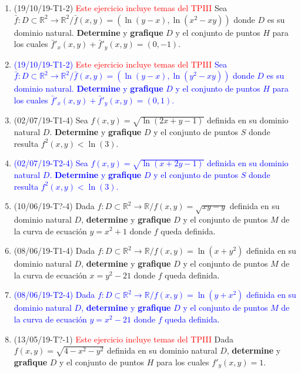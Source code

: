 \documentclass[12pt,a4paper]{article}
\newcommand{\red}[1]{\textcolor{red}{#1}}
\newcommand{\blue}[1]{\textcolor{blue}{#1}}
\newcommand{\R}{\mathbb{R}}
\begin{document}
\begin{enumerate}
	\item (19/10/19-T1-2) \red{Este ejercicio incluye temas del TPIII} Sea $\bar{f}: D\subset \R^2\rightarrow\R^2 / \bar{f}(x, y) = (\ln{(y-x)}, \ln(x^2-xy))$ donde $D$ es su dominio natural. \textbf{Determine} y \textbf{grafique} $D$ y el conjunto de puntos $H$ para los cuales $\bar{f}'_x(x,y)+\bar{f}'_y(x,y)=(0,-1)$. \label{ej:parciales8}
	
	\item \blue{(19/10/19-T1-2) \red{Este ejercicio incluye temas del TPIII} Sea $\bar{f}: D\subset \R^2\rightarrow\R^2 / \bar{f}(x, y) = (\ln{(y-x)}, \ln(y^2-xy))$ donde $D$ es su dominio natural. \textbf{Determine} y \textbf{grafique} $D$ y el conjunto de puntos $H$ para los cuales $\bar{f}'_x(x,y)+\bar{f}'_y(x,y)=(0,1)$.} \label{ej:parciales9}
	
	\item (02/07/19-T1-4) Sea $f(x, y)=\sqrt{\ln{(2x+y-1)}}$ definida en su dominio natural $D$. \textbf{Determine} y \textbf{grafique} $D$ y el conjunto de puntos $S$ donde resulta $f^2(x,y)<\ln(3)$.
	
	\item \blue{(02/07/19-T2-4) Sea $f(x, y)=\sqrt{\ln{(x+2y-1)}}$ definida en su dominio natural $D$. \textbf{Determine} y \textbf{grafique} $D$ y el conjunto de puntos $S$ donde resulta $f^2(x,y)<\ln(3)$.}
	
	\item (10/06/19-T?-4) Dada $f:D\subset\R^2\rightarrow\R / f(x, y)=\sqrt{xy-y}$ definida en su dominio natural $D$, \textbf{determine} y \textbf{grafique} $D$ y el conjunto de puntos $M$ de la curva de ecuación $y=x^2+1$ donde $f$ queda definida.
	
	\item (08/06/19-T1-4) Dada $f:D\subset\R^2\rightarrow\R / f(x, y)=\ln{(x+y^2)}$ definida en su dominio natural $D$, \textbf{determine} y \textbf{grafique} $D$ y el conjunto de puntos $M$ de la curva de ecuación $x=y^2-21$ donde $f$ queda definida.
	
	\item \blue{(08/06/19-T2-4) Dada $f:D\subset\R^2\rightarrow\R / f(x, y)=\ln{(y+x^2)}$ definida en su dominio natural $D$, \textbf{determine} y \textbf{grafique} $D$ y el conjunto de puntos $M$ de la curva de ecuación $y=x^2-21$ donde $f$ queda definida.}
	
	\item (13/05/19-T?-1) \red{Este ejercicio incluye temas del TPIII} Dada $ f(x, y)=\sqrt{4-x^2-y^2}$ definida en su dominio natural $D$, \textbf{determine} y \textbf{grafique} $D$ y el conjunto de puntos $H$ para los cuales $f'_y(x,y)=1$. \label{ej:parciales15}
	

\end{enumerate}
\end{document}
